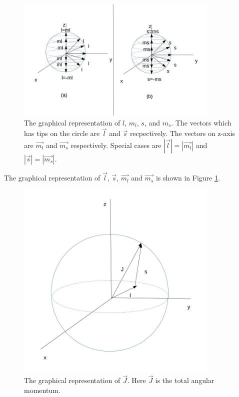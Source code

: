 \documentclass[12pt,journal,compsoc]{IEEEtran}
\begin{document}
\begin{figure}

\centering
\includegraphics[width=3.8in]{angular}
\caption{The graphical representation of $l$, $m_l$, $s$, and $m_s$. The vectors which has tips on the circle are $\vec{l}$ and $\vec{s}$ recpectively. The vectors on z-axis are $\vec{m_l}$ and $\vec{m_s}$ respectively. Special cases are $|\vec{l}| = |\vec{m_l}|$ and $|\vec{s}|= |\vec{m_s}|$.}
\label{angular}

\end{figure}

The graphical representation of $\vec{l}$, $\vec{s}$, $\vec{m_l}$ and $\vec{m_s}$ is shown in Figure \ref{angular}. 

\begin{figure}

\centering
\includegraphics[width=3.8in]{coordinate}
\caption{The graphical representation of $\vec{J}$. Here $\vec{J}$ is the total angular momentum.}
\label{coordinate}

\end{figure}
\end{document}
